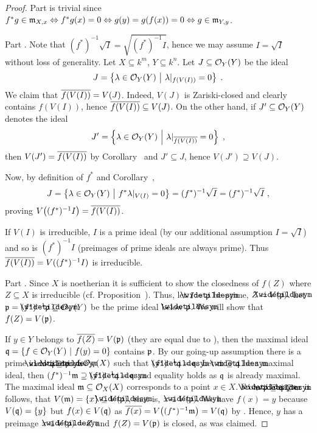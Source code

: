 \documentclass[a4paper,parskip=half,numbers=enddot, DIV=12]{scrreprt}
\begin{document}
	\begin{proof}
		Part  is trivial since $f^*g\in\mathfrak{m}_{X,x}\Leftrightarrow f^*g(x)=0\Leftrightarrow g(y)=g(f(x))=0\Leftrightarrow g\in\mathfrak{m}_{Y,y}$.
		
		Part . Note that $(f^*)^{-1}\sqrt I=\sqrt{(f^*)^{-1}I}$, hence we may assume $I = \sqrt{I}$ without loss of generality. Let $X\subseteq k^m$, $Y\subseteq k^n$. Let $J\subseteq \mathcal{O}_Y(Y)$ be the ideal
		\begin{align*}
			J=\left\{\lambda\in\mathcal{O}_Y(Y)\ \middle|\ \lambda|_{f(V(I))}=0\right\}\;.
		\end{align*}
		We claim that $\overline{f(V(I))}=V(J)$. Indeed, $V(J)$ is Zariski-closed and clearly contains $f(V(I))$, hence $\overline{f(V(I))}\subseteq V(J)$. On the other hand, if $J'\subseteq \mathcal{O}_Y(Y)$ denotes the ideal
		\begin{align*}
			J'=\left\{\lambda\in\mathcal{O}_Y(Y)\ \middle|\ \lambda|_{\overline{f(V(I))}}=0\right\}\;,
		\end{align*}
		then $V(J')=\overline{f(V(I))}$ by Corollary~ and $J'\subseteq J$, hence $V(J')\supseteq V(J)$.
		
		Now, by definition of $f^*$ and Corollary~,
		\begin{align*}
			J=\left\{\lambda\in \mathcal{O}_Y(Y)\ \middle|\  f^*\lambda|_{V(I)} = 0\right\}=(f^*)^{-1} \sqrt{I}=(f^*)^{-1} \sqrt{I}\;,
		\end{align*}
		proving $V\big((f^*)^{-1}I\big)=\overline{f(V(I))}$. 
		
		If $V(I)$ is irreducible, $I$ is a prime ideal (by our additional assumption $I= \sqrt{I}$) and so is $(f^*)^{-1}I$  (preimages of prime ideals are always prime). Thus $\overline{f(V(I))} = V((f^*)^{-1}I)$ is irreducible.
		
		Part . Since $X$ is noetherian it is sufficient to show the closedness of $f(Z)$ where $Z\subseteq X$ is irreducible (cf. Proposition~). Thus, let $I=\snake\pp$ be prime, $Z=V(\snake\pp)$. Let $\pp= (f^*)^{-1}\snake\pp\subseteq\Oo_Y(Y)$ be the prime ideal below $\snake \pp$.  We will show that $f(Z)=V(\mathfrak{p})$. 
			
		If $y\in Y$ belongs to $\overline{f(Z)} = V(\mathfrak{p})$ (they are equal due to ), then the maximal ideal  $\mathfrak{q} = \left\{f\in\mathcal{O}_Y(Y)\ \middle|\  f(y) = 0\right\}$ contains $\mathfrak{p}$. By our going-up assumption there is a prime ideal $\snake \qq\supseteq \snake\pp$ of $\mathcal{O}_X(X)$ such that $(f^*)^{-1} \snake\qq = \qq$. Let $\mm\supseteq \snake\qq$ be a maximal ideal, then $(f^*)^{-1}\mm \supseteq (f^*)^{-1} \snake\qq = \qq$ and equality holds as $\mathfrak{q}$ is already maximal. The maximal ideal $\mathfrak{m}\subseteq \mathcal{O}_X(X)$ corresponds to a point $x\in X$. From $\snake \pp\subseteq\snake\qq\subseteq\mm$ it follows, that $V(\mm) = \left\{x\right\}\subseteq V(\snake \pp)$, that is, $x\in V(\snake\pp)$. We have $f(x) = y$ because $V(\mathfrak{q}) = \left\{y\right\} $ but $f(x)\in V(\mathfrak{q})$ as $\overline{f(x)}=V\big((f^*)^{-1}\mathfrak{m}\big) = V(\mathfrak{q})$ by . Hence, $y$ has a preimage $x\in V(\snake \pp)=Z$ and $f(Z)=V(\mathfrak{p})$ is closed, as was claimed.
	\end{proof}
\end{document}
